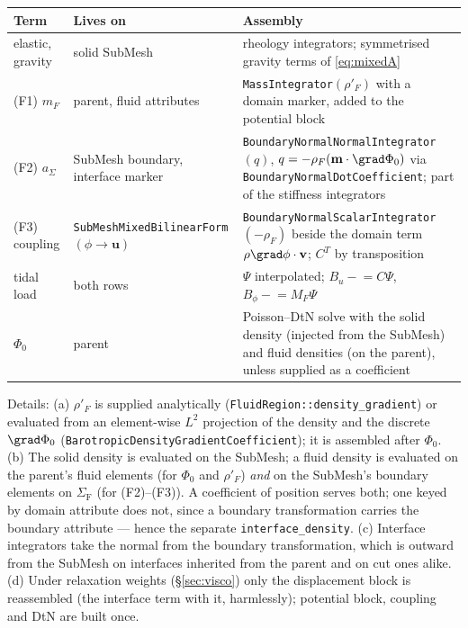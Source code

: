 \documentclass[11pt]{article}
\numberwithin{equation}{section}
\theoremstyle{remark}
\newcommand{\vu}{\mathbf{u}}
\newcommand{\vv}{\mathbf{v}}
\newcommand{\vm}{\mathbf{m}}
\newcommand{\SF}{\Sigma_{\mathrm{F}}}
\newcommand{\code}[1]{\texttt{#1}}
\begin{document}
\begin{center}
\small
\begin{tabular}{@{}P{2.4cm}P{4.4cm}P{7.4cm}@{}}
\toprule
Term & Lives on & Assembly \\
\midrule
elastic, gravity & solid SubMesh & rheology integrators; symmetrised gravity terms of \eqref{eq:mixedA} \\
(F1) $m_F$ & parent, fluid attributes & \code{MassIntegrator}$(\rho'_F)$ with a domain marker, added to the potential block \\
(F2) $a_\Sigma$ & SubMesh boundary, interface marker & \code{BoundaryNormalNormalIntegrator}$(q)$, $q = -\rho_F(\vm\cdot\grad\Phi_0)$ via \code{BoundaryNormalDotCoefficient}; part of the stiffness integrators \\
(F3) coupling & \code{SubMeshMixed\-BilinearForm} $(\phi\to\vu)$ & \code{BoundaryNormal\-ScalarIntegrator}$(-\rho_F)$ beside the domain term $\rho\grad\phi\cdot\vv$; $C^T$ by transposition \\
tidal load & both rows & $\Psi$ interpolated; $B_u \mathrel{-}= C\Psi$, $B_\phi \mathrel{-}= M_F\Psi$ \\
$\Phi_0$ & parent & Poisson--DtN solve with the solid density (injected from the SubMesh) and fluid densities (on the parent), unless supplied as a coefficient \\
\bottomrule
\end{tabular}
\end{center}

\noindent Details: (a) $\rho'_F$ is supplied analytically
(\code{FluidRegion::density\_gradient}) or evaluated from an element-wise
$L^2$ projection of the density and the discrete $\grad\Phi_0$
(\code{BarotropicDensityGradientCoefficient}); it is assembled after
$\Phi_0$. (b) The solid density is evaluated on the SubMesh; a fluid
density is evaluated on the parent's fluid elements (for $\Phi_0$ and
$\rho'_F$) \emph{and} on the SubMesh's boundary elements on $\SF$ (for
(F2)--(F3)). A coefficient of position serves both; one keyed by domain
attribute does not, since a boundary transformation carries the boundary
attribute --- hence the separate \code{interface\_density}. (c) Interface
integrators take the normal from the boundary transformation, which is
outward from the SubMesh on interfaces inherited from the parent and on cut
ones alike. (d) Under relaxation weights (\S\ref{sec:visco}) only the
displacement block is reassembled (the interface term with it, harmlessly);
potential block, coupling and DtN are built once.
\end{document}
